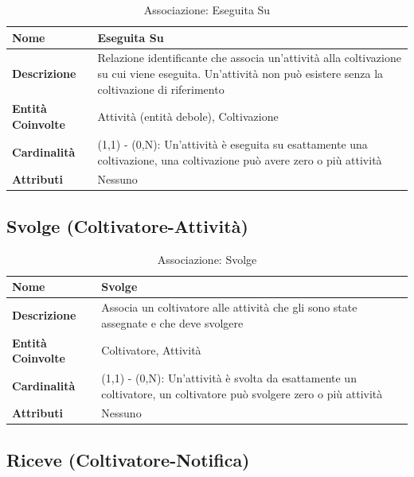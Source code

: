 \documentclass[12pt,a4paper]{article}
\begin{document}
\begin{table}[H]
\centering
\caption{Associazione: Eseguita Su}
\begin{tabularx}{\textwidth}{|l|X|}
\hline
\textbf{Nome} & Eseguita Su \\
\hline
\textbf{Descrizione} & Relazione identificante che associa un'attività alla coltivazione su cui viene eseguita. Un'attività non può esistere senza la coltivazione di riferimento \\
\hline
\textbf{Entità Coinvolte} & Attività (entità debole), Coltivazione \\
\hline
\textbf{Cardinalità} & (1,1) - (0,N): Un'attività è eseguita su esattamente una coltivazione, una coltivazione può avere zero o più attività \\
\hline
\textbf{Attributi} & Nessuno \\
\hline
\end{tabularx}
\end{table}

\subsection{Svolge (Coltivatore-Attività)}

\begin{table}[H]
\centering
\caption{Associazione: Svolge}
\begin{tabularx}{\textwidth}{|l|X|}
\hline
\textbf{Nome} & Svolge \\
\hline
\textbf{Descrizione} & Associa un coltivatore alle attività che gli sono state assegnate e che deve svolgere \\
\hline
\textbf{Entità Coinvolte} & Coltivatore, Attività \\
\hline
\textbf{Cardinalità} & (1,1) - (0,N): Un'attività è svolta da esattamente un coltivatore, un coltivatore può svolgere zero o più attività \\
\hline
\textbf{Attributi} & Nessuno \\
\hline
\end{tabularx}
\end{table}

\subsection{Riceve (Coltivatore-Notifica)}
\end{document}
